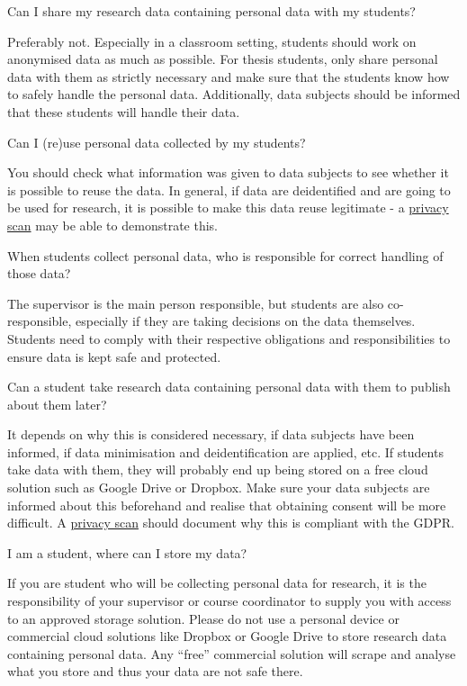 \documentclass[
]{book}
\begin{document}
Can I share my research data containing personal data with my students?

Preferably not. Especially in a classroom setting, students should work on anonymised data as much as possible. For thesis students, only share personal data with them as strictly necessary and make sure that the students know how to safely handle the personal data. Additionally, data subjects should be informed that these students will handle their data.

Can I (re)use personal data collected by my students?

You should check what information was given to data subjects to see whether it is possible to reuse the data. In general, if data are deidentified and are going to be used for research, it is possible to make this data reuse legitimate - a \protect\hyperlink{privacy-scan}{privacy scan} may be able to demonstrate this.

When students collect personal data, who is responsible for correct handling of those data?

The supervisor is the main person responsible, but students are also co-responsible, especially if they are taking decisions on the data themselves. Students need to comply with their respective obligations and responsibilities to ensure data is kept safe and protected.

Can a student take research data containing personal data with them to publish about them later?

It depends on why this is considered necessary, if data subjects have been informed, if data minimisation and deidentification are applied, etc. If students take data with them, they will probably end up being stored on a free cloud solution such as Google Drive or Dropbox. Make sure your data subjects are informed about this beforehand and realise that obtaining consent will be more difficult. A \protect\hyperlink{privacy-scan}{privacy scan} should document why this is compliant with the GDPR.

I am a student, where can I store my data?

If you are student who will be collecting personal data for research, it is the responsibility of your supervisor or course coordinator to supply you with access to an approved storage solution. Please do not use a personal device or commercial cloud solutions like Dropbox or Google Drive to store research data containing personal data. Any ``free'' commercial solution will scrape and analyse what you store and thus your data are not safe there.
\end{document}
